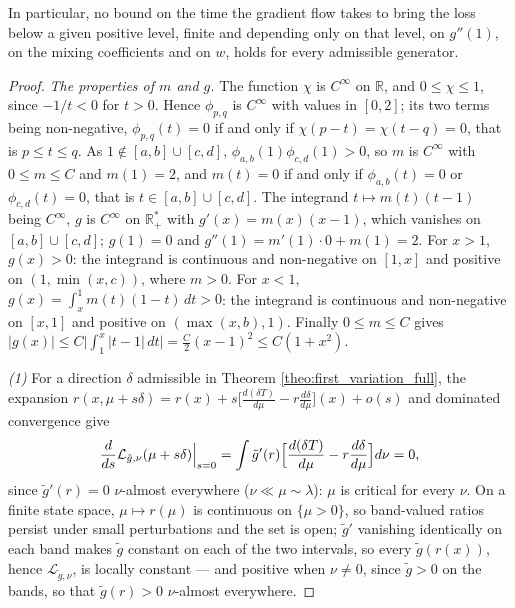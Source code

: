 \begin{proposition}
\begin{enumerate}
\end{enumerate}
In particular, no bound on the time the gradient flow takes to bring the loss below a given positive level, finite and depending only on that level, on $g''(1)$, on the mixing coefficients and on $w$, holds for every admissible generator.
\end{proposition}

\begin{proof}
\emph{The properties of $m$ and $g$.} The function $\chi$ is $C^\infty$ on $\mathbb R$, and $0\leq\chi\leq1$, since $-1/t<0$ for $t>0$. Hence $\phi_{p,q}$ is $C^\infty$ with values in $[0,2]$; its two terms being non-negative, $\phi_{p,q}(t)=0$ if and only if $\chi(p-t)=\chi(t-q)=0$, that is $p\leq t\leq q$. As $1\notin[a,b]\cup[c,d]$, $\phi_{a,b}(1)\phi_{c,d}(1)>0$, so $m$ is $C^\infty$ with $0\leq m\leq C$ and $m(1)=2$, and $m(t)=0$ if and only if $\phi_{a,b}(t)=0$ or $\phi_{c,d}(t)=0$, that is $t\in[a,b]\cup[c,d]$. The integrand $t\mapsto m(t)(t-1)$ being $C^\infty$, $g$ is $C^\infty$ on $\mathbb R_+^*$ with $g'(x)=m(x)(x-1)$, which vanishes on $[a,b]\cup[c,d]$; $g(1)=0$ and $g''(1)=m'(1)\cdot0+m(1)=2$. For $x>1$, $g(x)>0$: the integrand is continuous and non-negative on $[1,x]$ and positive on $(1,\min(x,c))$, where $m>0$. For $x<1$, $g(x)=\int_x^1m(t)(1-t)\,dt>0$: the integrand is continuous and non-negative on $[x,1]$ and positive on $(\max(x,b),1)$. Finally $0\leq m\leq C$ gives $|g(x)|\leq C\bigl|\int_1^x|t-1|\,dt\bigr|=\frac C2(x-1)^2\leq C(1+x^2)$.

\emph{(1)} For a direction $\delta$ admissible in Theorem \ref{theo:first_variation_full}, the expansion $r(x,\mu+s\delta)=r(x)+s\bigl[\frac{d(\delta T)}{d\mu}-r\frac{d\delta}{d\mu}\bigr](x)+o(s)$ and dominated convergence give
\begin{equation*}
    \frac d{ds}\mathcal L_{\tilde g,\nu}(\mu+s\delta)\Big|_{s=0}=\int \tilde g'(r)\Bigl[\frac{d(\delta T)}{d\mu}-r\frac{d\delta}{d\mu}\Bigr]d\nu=0,
\end{equation*}
since $\tilde g'(r)=0$ $\nu$-almost everywhere ($\nu\ll\mu\sim\lambda$): $\mu$ is critical for every $\nu$. On a finite state space, $\mu\mapsto r(\mu)$ is continuous on $\{\mu>0\}$, so band-valued ratios persist under small perturbations and the set is open; $\tilde g'$ vanishing identically on each band makes $\tilde g$ constant on each of the two intervals, so every $\tilde g(r(x))$, hence $\mathcal L_{\tilde g,\nu}$, is locally constant --- and positive when $\nu\neq0$, since $\tilde g>0$ on the bands, so that $\tilde g(r)>0$ $\nu$-almost everywhere.


\end{proof}
